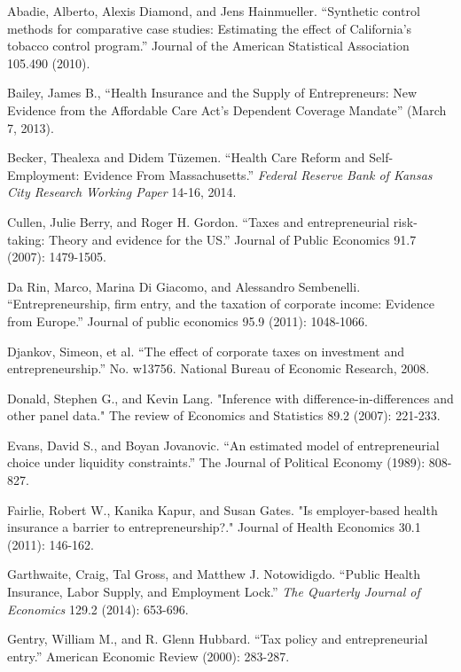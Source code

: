 \documentclass[12pt]{article}
\begin{document}
\newpage

\begin{thebibliography}{99}

Abadie, Alberto, Alexis Diamond, and Jens Hainmueller. ``Synthetic control methods for comparative case studies: Estimating the effect of California's tobacco control program.'' Journal of the American Statistical Association 105.490 (2010).

Bailey, James B., ``Health Insurance and the Supply of Entrepreneurs: New Evidence from the Affordable Care Act's Dependent Coverage Mandate'' (March 7, 2013). 

Becker, Thealexa and Didem T\"{u}zemen. ``Health Care Reform and Self-Employment: Evidence From Massachusetts.'' \emph{Federal Reserve Bank of Kansas City Research Working Paper} 14-16, 2014.

Cullen, Julie Berry, and Roger H. Gordon. ``Taxes and entrepreneurial risk-taking: Theory and evidence for the US.'' Journal of Public Economics 91.7 (2007): 1479-1505.

Da Rin, Marco, Marina Di Giacomo, and Alessandro Sembenelli. ``Entrepreneurship, firm entry, and the taxation of corporate income: Evidence from Europe.'' Journal of public economics 95.9 (2011): 1048-1066.

Djankov, Simeon, et al. ``The effect of corporate taxes on investment and entrepreneurship.'' No. w13756. National Bureau of Economic Research, 2008.

Donald, Stephen G., and Kevin Lang. "Inference with difference-in-differences and other panel data." The review of Economics and Statistics 89.2 (2007): 221-233.

Evans, David S., and Boyan Jovanovic. ``An estimated model of entrepreneurial choice under liquidity constraints.'' The Journal of Political Economy (1989): 808-827.

Fairlie, Robert W., Kanika Kapur, and Susan Gates. "Is employer-based health insurance a barrier to entrepreneurship?." Journal of Health Economics 30.1 (2011): 146-162.

Garthwaite, Craig, Tal Gross, and Matthew J. Notowidigdo. ``Public Health Insurance, Labor Supply, and Employment Lock.'' \emph{The Quarterly Journal of Economics} 129.2 (2014): 653-696.

Gentry, William M., and R. Glenn Hubbard. ``Tax policy and entrepreneurial entry.'' American Economic Review (2000): 283-287.


\end{thebibliography}
\end{document}
